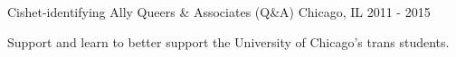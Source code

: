 \begin{cventries}
  \cventry
    {Cishet-identifying Ally} %
    {Queers \& Associates (Q\&A)} %
    {Chicago, IL} %
    {2011 - 2015} %
    {
      \begin{cvitems} %
        \item {Support and learn to better support the University of Chicago's trans students.}
      \end{cvitems}
    }

\end{cventries}

